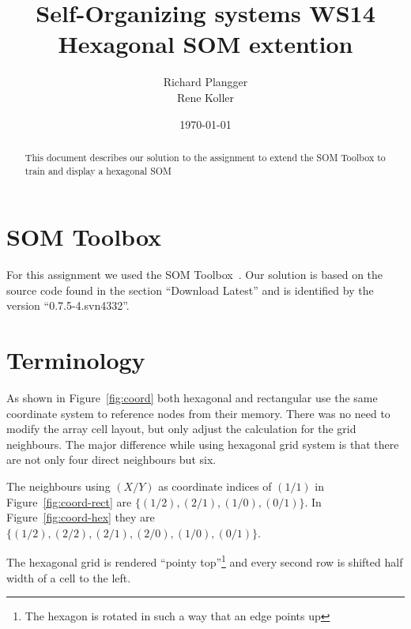\documentclass{acm_proc_article-sp}
\begin{document}
\title{Self-Organizing systems WS14\\
       Hexagonal SOM extention}

\author{
Richard Plangger\\
\alignauthor
Rene Koller\\
\alignauthor
}

\date{\today}

\maketitle

\begin{abstract}
    This document describes our solution to the assignment
    to extend the SOM Toolbox to train and display a hexagonal
    SOM
\end{abstract}


\section{SOM Toolbox}

For this assignment we used the SOM Toolbox~\cite{somtoolbox}. Our solution
is based on the source code found in the section ``Download Latest'' and is
identified by the version ``0.7.5-4.svn4332''.

\section{Terminology}

As shown in Figure~\ref{fig:coord} both hexagonal and rectangular
use the same coordinate system to reference nodes from their memory.
There was no need to modify the array cell layout, but only adjust the
calculation for the grid neighbours. The major
difference while using hexagonal grid system is that there are not only
four direct neighbours but six.

The neighbours using $(X/Y)$ as coordinate indices of $(1/1)$ in Figure~\ref{fig:coord-rect}
are $\{(1/2),(2/1),(1/0),(0/1)\}$. In Figure~\ref{fig:coord-hex} they are $\{(1/2),(2/2),(2/1),(2/0),(1/0),(0/1)\}$.

The hexagonal grid is rendered ``pointy top''\footnote{The hexagon is rotated in such a way that an edge points up} and every second row is shifted half width of a
cell to the left.
\end{document}
